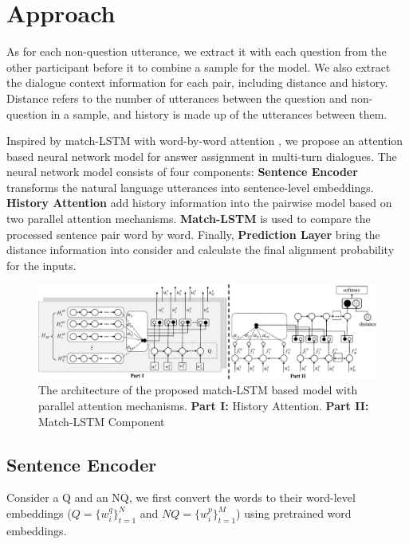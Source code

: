 \section{Approach}
\label{sec:method}
As for each non-question utterance, we extract it with each question from the other participant before it to combine a sample for the model. We also extract the dialogue context information for each pair, including distance and history. Distance refers to the number of utterances between the question and non-question in a sample, and history is made up of the utterances between them. 

Inspired by match-LSTM with word-by-word attention \cite{wang2015learning}, we propose an attention based neural network model for answer assignment in multi-turn dialogues. The neural network model consists of four components: \textbf{Sentence Encoder} transforms the natural language utterances into sentence-level embeddings. \textbf{History Attention} add history information into the pairwise model based on two parallel attention mechanisms. \textbf{Match-LSTM} is used to compare the processed sentence pair word by word. Finally, \textbf{Prediction Layer} bring the distance information into consider and calculate the final alignment probability for the inputs.

\begin{figure}
	\centering
	\includegraphics[scale=0.42]{pictures/figure4.eps}
	\caption{The architecture of the proposed match-LSTM based model with parallel attention mechanisms. \textbf{Part I:} History Attention. \textbf{Part II:} Match-LSTM Component}
	
	\label{fig:model1}
\end{figure}

\subsection{Sentence Encoder}
\label{sec:sentence-encoder}

Consider a Q and an NQ, we first convert the words to their word-level embeddings ($Q=\{w_i^q\}_{t=1}^{N}$ and $NQ= \{w_i^p\}_{t=1}^{M}$) using pretrained word embeddings.

